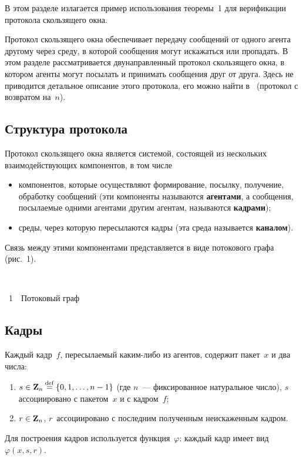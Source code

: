 \begin{multicols}{2}
В этом разделе излагается пример использования теоремы~1
для верификации протокола скользящего окна.

Протокол скользящего окна обеспечивает передачу сообщений от одного
агента другому через среду, в которой сообщения могут искажаться или
пропадать. В этом разделе рассматривается двунаправленный протокол
скользящего окна, в котором агенты могут посылать и принимать
сообщения друг от друга. Здесь не приводится детальное описание
этого протокола, его можно найти в~\cite[п.~3.4.2]{12-mir}
(протокол с возвратом на~$n$).

\subsection{Структура протокола}

Протокол скользящего окна является системой,
состоящей из нескольких взаимодействующих компонентов, в том числе
\begin{itemize}
\item  компонентов, которые осуществляют формирование, посылку, получение,
обработку сообщений (эти компоненты называются {\bf агентами}, а сообщения, посылаемые
одними агентами другим агентам, называются {\bf кадрами});
\item среды, через которую пересылаются кадры (эта среда называется
{\bf каналом}).
\end{itemize}
Связь между этими компонентами представляется
в виде потокового графа (рис.~1).

\vspace*{8pt}

\noindent
\begin{center}  %
\mbox{%
\epsfxsize=75.215mm
}
  \vspace*{5pt}

{{\figurename~1}\ \ \small{Потоковый граф}}
  \end{center}


\addtocounter{figure}{1}



\subsection{Кадры}

Каждый кадр~$f$, пересылаемый ка\-ким-ли\-бо
из агентов, содержит пакет~$x$ и два числа:
\begin{enumerate}[(1)]
\item
$s \in {\bf Z}_n\mathbin{{\mathop{=}\limits^{\mathrm{def}}}}\{0,1,\ldots, n-1\}$
   (где $n$~--- фиксированное натуральное число), $s$
ассоциировано с пакетом~$x$ и с кадром~$f$;
\item $r \in {\bf Z}_n$,
   $r$~ассоциировано с последним полученным  неискаженным кадром.
   \end{enumerate}
Для построения кадров используется
функция~$\varphi$: каждый кадр имеет вид $\varphi(x, s, r)$.


\end{multicols}
